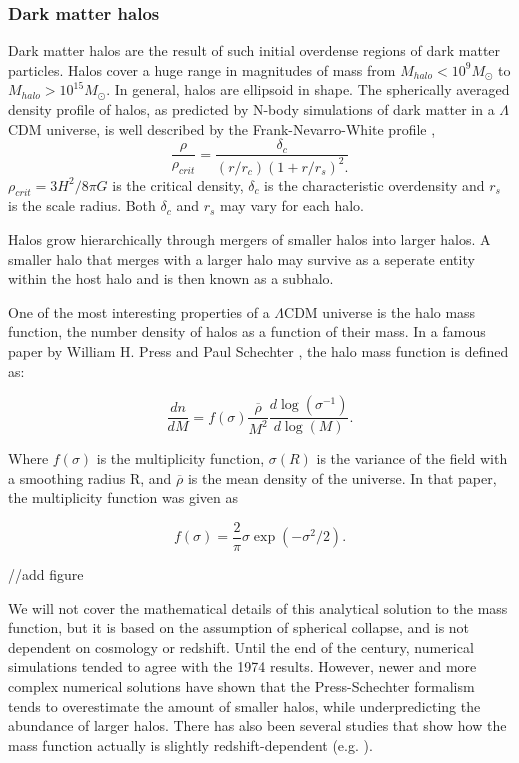 \subsubsection{Dark matter halos}
Dark matter halos are the result of such initial overdense regions of dark matter particles. Halos cover a huge range in magnitudes of mass from $M_{halo} <10^9 M_{\odot}$ to $M_{halo} >10^{15} M_{\odot}$. In general, halos are ellipsoid in shape. The spherically averaged density profile of halos, as predicted by N-body simulations of dark matter in a $\Lambda$CDM universe, is well described by the Frank-Nevarro-White profile \parencite{Navarro1996},
\begin{equation}
    \frac{\rho}{\rho_{crit}} = \frac{\delta_c}{(r/r_c)(1+r/r_s)^2.}
\end{equation}
$\rho_{crit} = 3H^2/8\pi G$ is the critical density, $\delta_c$ is the characteristic overdensity and $r_s$ is the scale radius. Both $\delta_c$ and $r_s$ may vary for each halo.

Halos grow hierarchically through mergers of smaller halos into larger halos. A smaller halo that merges with a larger halo may survive as a seperate entity within the host halo and is then known as a subhalo. 

One of the most interesting properties of a $\Lambda$CDM universe is the halo mass function, the number density of halos as a function of their mass. In a famous paper by William H. Press and Paul Schechter \parencite{Press1974}, the halo mass function is defined as:

\begin{equation}
    \frac{dn}{dM} = f(\sigma)\frac{\overline{\rho}}{M^2}\frac{d\log(\sigma^{-1})}{d\log(M)}.
\end{equation}

Where $f(\sigma)$ is the multiplicity function, $\sigma (R)$ is the variance of the field with a smoothing radius R, and $\overline{\rho}$ is the mean density of the universe. In that paper, the multiplicity function was given as

\begin{equation}
    f(\sigma) = \frac{2}{\pi} \sigma \exp(-\sigma^2/2).
\end{equation}

//add figure

We will not cover the mathematical details of this analytical solution to the mass function, but it is based on the assumption of spherical collapse, and is not dependent on cosmology or redshift. Until the end of the century, numerical simulations tended to agree with the 1974 results. However, newer and more complex numerical solutions have shown that the Press-Schechter formalism tends to overestimate the amount of smaller halos, while underpredicting the abundance of larger halos. There has also been several studies that show how the mass function actually is slightly redshift-dependent (e.g. \cite{Tinker2008}).


